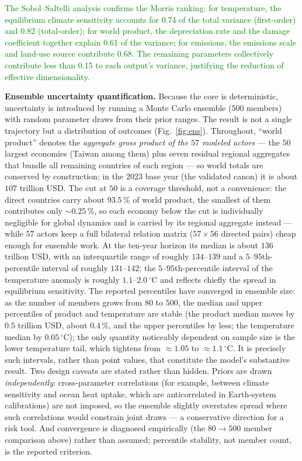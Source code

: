 \documentclass[a4paper,fleqn]{cas-sc}
\begin{document}
\textcolor{green}{The Sobol–Saltelli analysis confirms the Morris ranking: for temperature, the equilibrium climate sensitivity accounts for 0.74 of the total variance (first-order) and 0.82 (total-order); for world product, the depreciation rate and the damage coefficient together explain 0.61 of the variance; for emissions, the emissions scale and land-use source contribute 0.68. The remaining parameters collectively contribute less than 0.15 to each output's variance, justifying the reduction of effective dimensionality.}

\textbf{Ensemble uncertainty quantification.} Because the core is deterministic, uncertainty is
introduced by running a Monte Carlo ensemble ($500$ members) with random parameter draws from their
prior ranges. The result is not a single trajectory but a distribution of outcomes
(Fig.~\ref{fig:ens}). Throughout, ``world product'' denotes the \emph{aggregate gross product of the
$57$ modeled actors} --- the $50$ largest economies (Taiwan among them) plus seven residual
regional aggregates that bundle all remaining countries of each region --- so world totals are
conserved by construction; in the $2023$ base year (the validated canon) it is about $107$
trillion USD. The cut at $50$ is a coverage threshold, not a convenience: the direct countries
carry about $93.5\,\%$ of world product, the smallest of them contributes only
${\sim}0.25\,\%$, so each economy below the cut is individually negligible for global dynamics
and is carried by its regional aggregate instead --- while $57$ actors keep a full bilateral
relation matrix ($57{\times}56$ directed pairs) cheap enough for ensemble work. At the ten-year horizon its median is about $136$ trillion USD, with an interquartile
range of roughly $134$--$139$ and a $5$--$95$th-percentile interval of roughly $131$--$142$; the
$5$--$95$th-percentile interval of the temperature anomaly is roughly $1.1$--$2.0\,^\circ$C and
reflects chiefly the spread in equilibrium sensitivity. The reported percentiles have converged in
ensemble size: as the number of members grows from $80$ to $500$, the median and upper percentiles
of product and temperature are stable (the product median moves by $0.5$ trillion USD, about
$0.4\,\%$, and the upper percentiles by less; the temperature median by $0.05\,^\circ$C); the only
quantity noticeably dependent on sample size is the lower temperature tail,
which tightens from $\approx1.05$ to $\approx1.1\,^\circ$C. It is precisely such intervals, rather
than point values, that constitute the model's substantive result. Two design caveats are stated
rather than hidden. Priors are drawn \emph{independently}: cross-parameter correlations (for
example, between climate sensitivity and ocean heat uptake, which are anticorrelated in
Earth-system calibrations) are not imposed, so the ensemble slightly overstates spread where such
correlations would constrain joint draws --- a conservative direction for a risk tool. And
convergence is diagnosed empirically (the $80\!\to\!500$ member comparison above) rather than
assumed; percentile stability, not member count, is the reported criterion.
\end{document}
